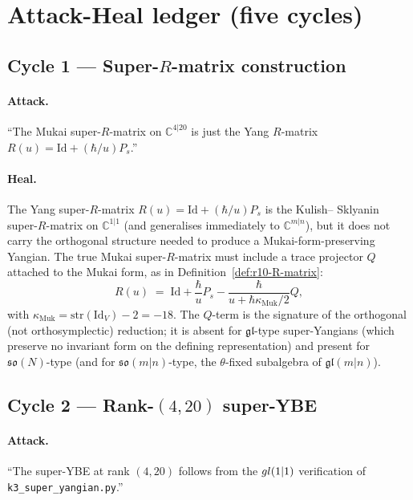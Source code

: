 \documentclass{article}
\providecommand{\C}{\mathbb C}
\providecommand{\fgl}{\mathfrak{gl}}
\providecommand{\fso}{\mathfrak{so}}
\providecommand{\Id}{\mathrm{Id}}
\providecommand{\str}{\mathrm{str}}
\theoremstyle{definition}
\begin{document}
\section{Attack-Heal ledger (five cycles)}
\label{sec:r10-attack-heal}

\subsection{Cycle 1 — Super-$R$-matrix construction}

\paragraph{Attack.}
``The Mukai super-$R$-matrix on $\C^{4|20}$ is just the Yang
$R$-matrix $R(u) = \Id + (\hbar/u) P_s$.''

\paragraph{Heal.}
The Yang super-$R$-matrix $R(u) = \Id + (\hbar/u) P_s$ is the Kulish--
Sklyanin super-$R$-matrix on $\C^{1|1}$ (and generalises immediately
to $\C^{m|n}$), but it does not carry the orthogonal structure
needed to produce a Mukai-form-preserving Yangian. The true
Mukai super-$R$-matrix must include a trace projector $Q$ attached
to the Mukai form, as in Definition~\ref{def:r10-R-matrix}:
\begin{equation*}
  R(u)
  \;=\;
  \Id + \frac{\hbar}{u} P_s - \frac{\hbar}{u + \hbar \kappa_{\mathrm{Muk}}/2} Q,
\end{equation*}
with $\kappa_{\mathrm{Muk}} = \str(\Id_V) - 2 = -18$. The $Q$-term is
the signature of the orthogonal (not orthosymplectic) reduction; it
is absent for $\fgl$-type super-Yangians (which preserve no
invariant form on the defining representation) and present for
$\fso(N)$-type (and for $\fso(m|n)$-type, the $\theta$-fixed
subalgebra of $\fgl(m|n)$).

\subsection{Cycle 2 — Rank-$(4,20)$ super-YBE}

\paragraph{Attack.}
``The super-YBE at rank $(4, 20)$ follows from the $gl(1|1)$
verification of \texttt{k3\_super\_yangian.py}.''
\end{document}
